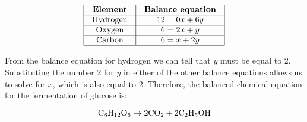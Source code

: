 
$$\vbox{\offinterlineskip
\halign{\strut
\vrule \quad\hfil # \ \hfil & 
\vrule \quad\hfil # \ \hfil \vrule \cr
\noalign{\hrule}
%
{\bf Element} & {\bf Balance equation} \cr
%
\noalign{\hrule}
%
Hydrogen & $12 = 0x + 6y$ \cr
%
\noalign{\hrule}
%
Oxygen & $6 = 2x + y$ \cr
%
\noalign{\hrule}
%
Carbon & $6 = x + 2y$ \cr
%
\noalign{\hrule}
} %
}$$ %

From the balance equation for hydrogen we can tell that $y$ must be equal to 2.  Substituting the number 2 for $y$ in either of the other balance equations allows us to solve for $x$, which is also equal to 2.  Therefore, the balanced chemical equation for the fermentation of glucose is:

$$\hbox{C}_6 \hbox{H}_{12} \hbox{O}_6 \to 2 \hbox{CO}_2 + 2 \hbox{C}_2 \hbox{H}_5 \hbox{OH}$$





